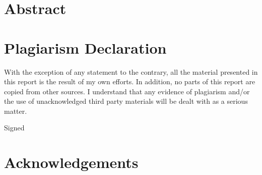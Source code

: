 \documentclass[11pt]{report}
\begin{document}
\maketitle

\chapter*{Abstract}
\blindtext[1] %

\chapter*{Plagiarism Declaration}
With the exception of any statement to the contrary, all the material presented in this report is the result of my own efforts. In addition, no parts of this report are copied from other sources. I understand that any evidence of plagiarism and/or the use of unacknowledged third party materials will be dealt with as a serious matter.

\vspace{2cm}
Signed 

\chapter*{Acknowledgements}
\blindtext[1]

\tableofcontents
\listoffigures
\listoftables
\lstlistoflistings		%

\newpage
\setcounter{page}{0}

 

\renewcommand\bibname{References}
\printbibliography


\end{document}
